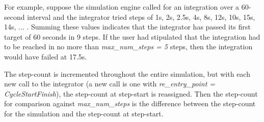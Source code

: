 For example, suppose the simulation engine called for an integration over
a 60-second interval and the integrator tried steps of 1s, 2s, 2.5s, 4s,
8s, 12s, 10s, 15s, 14s, ... .  Summing these values indicates that the
integrator has passed its first target of 60 seconds in 9 steps. If the user
had stipulated that the integration had to be reached in no more than
\textit{max\_num\_steps = 5} steps, then the integration would have failed
at 17.5s.

The step-count is incremented throughout the entire simulation, but with
each new call to the integrator (a new call is one with
\textit{re\_entry\_point
= CycleStartFinish}), the step-count at step-start is reassigned. Then
the step-count for comparison against \textit{max\_num\_steps} is the
difference
between the step-count for the simulation and the step-count at step-start.

